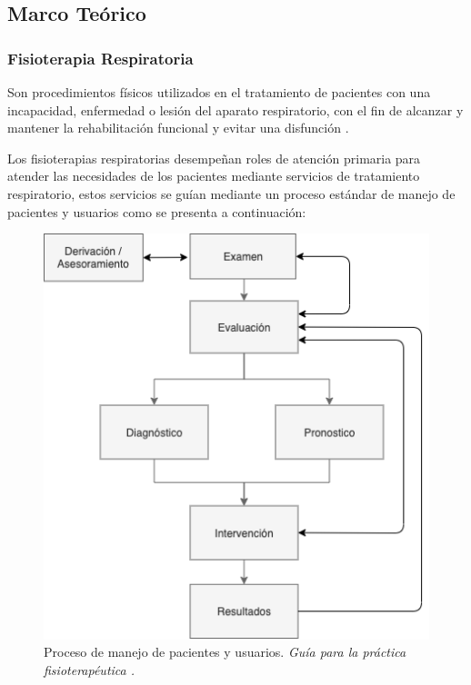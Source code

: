 \documentclass[12pt]{article}
\begin{document}
\subsection{Marco Teórico}

\subsubsection{Fisioterapia Respiratoria}

Son procedimientos físicos utilizados en el tratamiento de pacientes con una incapacidad, enfermedad o lesión del aparato respiratorio, con el fin de alcanzar y mantener la rehabilitación funcional y evitar una disfunción \cite{26}. 

Los fisioterapias respiratorias desempeñan roles de atención primaria para atender las necesidades de los pacientes mediante servicios de tratamiento respiratorio, estos servicios se guían mediante un proceso estándar de manejo de pacientes y usuarios como se presenta a continuación:



\begin{figure}[ht]
\centering
\includegraphics[scale=0.45]{imag/C4-Terapeuta.png}
\caption{Proceso de manejo de pacientes y usuarios. \textit{Guía para la práctica fisioterapéutica \cite{5}.}}
\label{2}
\end{figure}
\FloatBarrier
\end{document}
